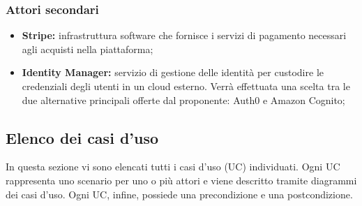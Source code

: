 \subsubsection{Attori secondari}
\begin{itemize}
\item \textbf{Stripe:} infrastruttura software che fornisce i servizi di pagamento necessari agli acquisti nella piattaforma;
\item \textbf{Identity Manager:} servizio di gestione delle identità per custodire le credenziali degli utenti in un cloud esterno. Verrà effettuata una scelta tra le due alternative principali offerte dal proponente: Auth0 e Amazon Cognito;
\end{itemize}
\subsection{Elenco dei casi d'uso}
In questa sezione vi sono elencati tutti i casi d'uso (UC) individuati. Ogni UC rappresenta uno scenario per uno o più attori e viene descritto tramite diagrammi dei casi d'uso. Ogni UC, infine, possiede una precondizione e una postcondizione. \\












